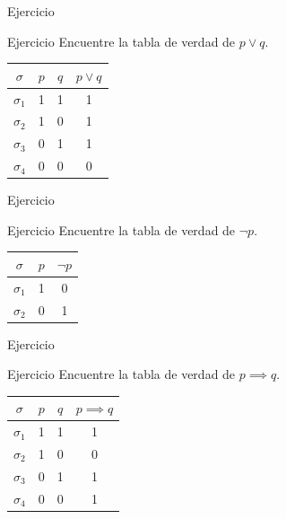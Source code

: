 \documentclass[dvisvgm,hypertex,aspectratio=169]{beamer}
\begin{document}
\begin{frame}{Ejercicio}
  \begin{block}{Ejercicio}
    Encuentre la tabla de verdad de $p\lor q$.

    \pause
    \begin{center}
      \begin{tabular}{ |c|c|c|c| }
        \hline
        $\sigma$ & $p$ & $q$ & $p\lor q$ \\
        \hline
        $\sigma_1$ & 1 & 1 & 1 \\
        $\sigma_2$ & 1 & 0 & 1 \\
        $\sigma_3$ & 0 & 1 & 1 \\
        $\sigma_4$ & 0 & 0 & 0 \\
        \hline
      \end{tabular}
    \end{center}
  \end{block}
\end{frame}
\begin{frame}{Ejercicio}
  \begin{block}{Ejercicio}
    Encuentre la tabla de verdad de $\neg p$.

    \pause
    \begin{center}
      \begin{tabular}{ |c|c|c| }
        \hline
        $\sigma$ & $p$ & $\neg p$ \\
        \hline
        $\sigma_1$ & 1 & 0 \\
        $\sigma_2$ & 0 & 1 \\
        \hline
      \end{tabular}
    \end{center}
  \end{block}
\end{frame}
\begin{frame}{Ejercicio}
  \begin{block}{Ejercicio}
    Encuentre la tabla de verdad de $p\implies q$.

    \pause
    \begin{center}
      \begin{tabular}{ |c|c|c|c| }
        \hline
        $\sigma$ & $p$ & $q$ & $p\implies q$ \\
        \hline
        $\sigma_1$ & 1 & 1 & 1 \\
        $\sigma_2$ & 1 & 0 & 0 \\
        $\sigma_3$ & 0 & 1 & 1 \\
        $\sigma_4$ & 0 & 0 & 1 \\
        \hline
      \end{tabular}
    \end{center}
  \end{block}
\end{frame}
\end{document}
